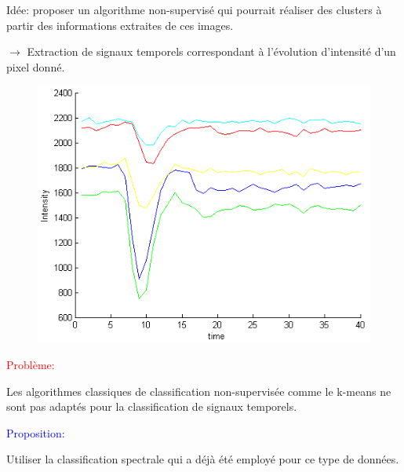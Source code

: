 \documentclass{beamer}
\begin{document}
\begin{frame}[allowframebreaks]
Idée: proposer un algorithme non-supervisé qui pourrait réaliser des clusters à partir des informations extraites de ces images.

$\rightarrow$ Extraction de signaux temporels correspondant à l'évolution d'intensité d'un pixel donné.

\begin{figure}
\centering
    \includegraphics[scale=0.5,angle=0]{CourbeExample.png}
    \label{fig:Courbe} 
\end{figure}

\end{frame}

\begin{frame}

\textcolor{red}{Problème:}

\medskip

Les algorithmes classiques de classification non-supervisée comme le k-means ne sont pas adaptés pour la classification de signaux temporels.

\medskip

\textcolor{blue}{Proposition:}

\medskip

Utiliser la classification spectrale qui a déjà été employé pour ce type de données.

\end{frame}
\end{document}
